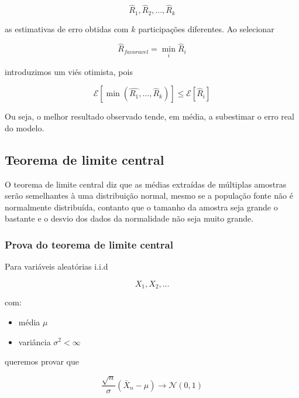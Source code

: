 \documentclass{article}
\begin{document}
\begin{equation*}
    \hat{R}_1, \hat{R}_2, ..., \hat{R}_k
\end{equation*}

as estimativas de erro obtidas com $k$ participações diferentes. Ao selecionar

\begin{equation*}
    \hat{R}_{favoravel} = \min_i \hat{R}_i
\end{equation*}

introduzimos um viés otimista, pois

\begin{equation*}
    \mathcal{E}[\min(\hat{R_1},..., \hat{R}_k)] \leq \mathcal{E}[\hat{R}_i]
\end{equation*}

Ou seja, o melhor resultado observado tende, em média, a subestimar o erro real do modelo.

\subsection{Teorema de limite central}

O teorema de limite central diz que as médias extraídas de múltiplas amostras serão semelhantes à uma distribuição normal, mesmo se a população fonte não é normalmente distribuída, contanto que o tamanho da amostra seja grande o bastante e o desvio dos dados da normalidade não seja muito grande.

\subsubsection{Prova do teorema de limite central}

Para variáveis aleatórias i.i.d

\begin{equation*}
    X_1, X_2, ...
\end{equation*}

com:

\begin{itemize}
    \item média $\mu$
    \item variância $\sigma^2 < \infty$
\end{itemize}

queremos provar que 

\begin{equation*}
    \frac{\sqrt{n}}{\sigma}(\bar{X}_n - \mu) \rightarrow \mathcal{N}(0, 1)
\end{equation*}
\end{document}
